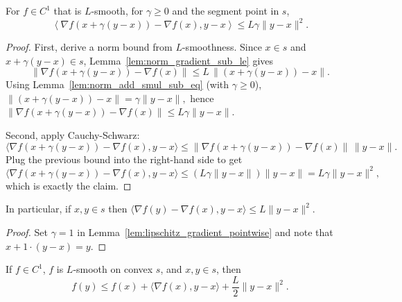 
\begin{lemma}\label{lem:lipschitz_gradient_pointwise}
  \leanok{}
  For $f\in C^1$ that is $L$-smooth, for $\gamma\ge 0$ and the segment point in $s$,
  \[
    \left\langle \nabla f(x+\gamma(y-x))-\nabla f(x),y-x\right\rangle
    \le L\gamma\|y-x\|^2.
  \]
\end{lemma}
\begin{proof}
  \leanok{}
  First, derive a norm bound from $L$-smoothness. Since $x\in s$ and
  $x+\gamma(y-x)\in s$, Lemma~\ref{lem:norm_gradient_sub_le} gives
  \[
    \|\nabla f(x+\gamma(y-x)) - \nabla f(x)\|
    \le L\,\|(x+\gamma(y-x))-x\|.
  \]
  Using Lemma~\ref{lem:norm_add_smul_sub_eq} (with $\gamma\ge 0$),
  \(
    \|(x+\gamma(y-x))-x\| = \gamma\|y-x\|,
  \)
  hence
  \(
    \|\nabla f(x+\gamma(y-x)) - \nabla f(x)\|
    \le L\gamma\|y-x\|.
  \)

  Second, apply Cauchy-Schwarz:
  \[
    \langle \nabla f(x+\gamma(y-x)) - \nabla f(x),y-x\rangle
    \le \|\nabla f(x+\gamma(y-x)) - \nabla f(x)\|\,\|y-x\|.
  \]
  Plug the previous bound into the right-hand side to get
  \[
    \langle \nabla f(x+\gamma(y-x)) - \nabla f(x),y-x\rangle
    \le (L\gamma\|y-x\|)\|y-x\| = L\gamma\|y-x\|^2,
  \]
  which is exactly the claim.
\end{proof}

\begin{lemma}[Non-parametric corollary ($\gamma=1$)]\label{lem:inner_grad_diff_le_L}
  \leanok{}
  In particular, if $x,y\in s$ then
  $\langle \nabla f(y)-\nabla f(x),y-x\rangle\le L\|y-x\|^2$.
\end{lemma}
\begin{proof}
  \leanok{}
  Set $\gamma=1$ in Lemma~\ref{lem:lipschitz_gradient_pointwise} and note that
  $x+1\cdot(y-x)=y$.
\end{proof}

\begin{theorem}\label{thm:l_smooth_quadratic_upper_bound}
  \leanok{}
  If $f\in C^1$, $f$ is $L$-smooth on convex $s$, and $x,y\in s$, then
  \[
    f(y)\le f(x)+\langle \nabla f(x),y-x\rangle+\frac{L}{2}\|y-x\|^2.
  \]
\end{theorem}

